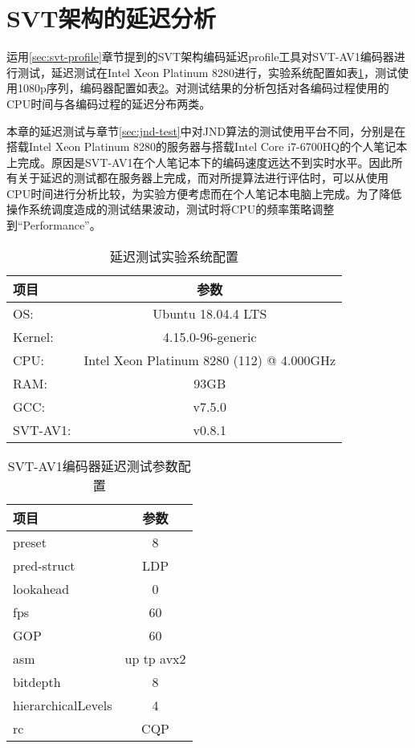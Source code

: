 \section{SVT架构的延迟分析}
运用\ref{sec:svt-profile}章节提到的SVT架构编码延迟profile工具对SVT-AV1编码器进行测试，延迟测试在Intel Xeon Platinum 8280进行，实验系统配置如表\ref{tab:os-8280}，测试使用1080p序列，编码器配置如表\ref{tab:svt-lat}。对测试结果的分析包括对各编码过程使用的CPU时间与各编码过程的延迟分布两类。

本章的延迟测试与章节\ref{sec:jnd-test}中对JND算法的测试使用平台不同，分别是在搭载Intel Xeon Platinum 8280的服务器与搭载Intel Core i7-6700HQ的个人笔记本上完成。原因是SVT-AV1在个人笔记本下的编码速度远达不到实时水平。因此所有关于延迟的测试都在服务器上完成，而对所提算法进行评估时，可以从使用CPU时间进行分析比较，为实验方便考虑而在个人笔记本电脑上完成。为了降低操作系统调度造成的测试结果波动，测试时将CPU的频率策略调整到“Performance”。

\begin{table}[!hpt]
	\renewcommand{\arraystretch}{0.9}
	\caption{延迟测试实验系统配置}
	\label{tab:os-8280}
	\centering
	\begin{tabular}{lc} \toprule
		项目& 参数  \\ \midrule
		OS:     &Ubuntu 18.04.4 LTS\\
		Kernel: & 4.15.0-96-generic\\
		CPU:    &Intel Xeon Platinum 8280 (112) @ 4.000GHz\\
		RAM:    &93GB\\
		GCC:    &v7.5.0\\
		SVT-AV1: & v0.8.1\\ \bottomrule
	\end{tabular}
\end{table}

\begin{table}[!hpt]
	\renewcommand{\arraystretch}{0.9}
	\caption{SVT-AV1编码器延迟测试参数配置}
	\label{tab:svt-lat}
	\centering
	\begin{tabular}{lc} \toprule
		项目& 参数  \\ \midrule
		preset     &8\\
		pred-struct& LDP\\
		lookahead    &0\\
		fps    &60\\
		GOP    &60\\
		asm    & up tp avx2\\
		bitdepth & 8\\
		hierarchicalLevels  & 4 \\
		rc & CQP\\ \bottomrule
	\end{tabular}
\end{table}

